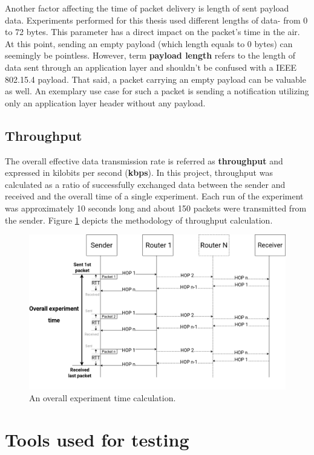 Another factor affecting the time of packet delivery is length of sent payload data. 
Experiments performed for this thesis used different lengths of data- from 0 to 72 bytes. This parameter has a direct impact on the packet's 
time in the air. At this point, sending an empty payload (which length equals to 0 
bytes) can seemingly be pointless. However, term \textbf{payload length} refers to the
length of data sent through an application layer and shouldn't be confused with a IEEE 802.15.4 
payload. That said, a packet carrying an empty payload can be valuable as well. An 
exemplary use case for such a packet is sending a notification utilizing only an 
application layer header without any payload.


\subsection*{Throughput}

The overall effective data transmission rate is referred as \textbf{throughput} and expressed in kilobits per second (\textbf{kbps}). In this project, throughput was calculated as a ratio of successfully exchanged data between the sender and received and the overall time of a single experiment. Each run of the experiment
was approximately 10 seconds long and about 150 packets were transmitted from the sender. Figure \ref{fig:throughput} depicts the methodology of throughput calculation.

\begin{figure}[H]
    \centering
    \includegraphics[scale=0.35]{images/throughput-diagram.drawio.png}
    \caption{An overall experiment time calculation.}
    \label{fig:throughput}
\end{figure}

\section{Tools used for testing}

